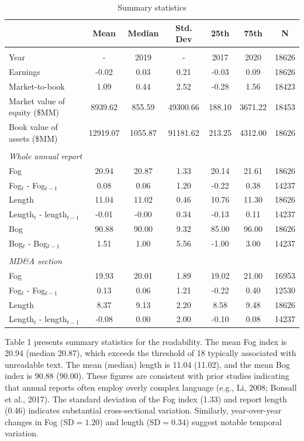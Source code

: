 \documentclass[a4paper]{article}
\begin{document}
\begin{table}[ht]
\centering
\caption{Summary statistics}  
\label{tab:summary_statistics}
\begin{tabular}{lcccccc}
  \hline
 & Mean & Median & Std. Dev & 25th & 75th & N \\ 
  \hline
  \midrule
  \\[0.5ex]
Year & - & 2019 & - & 2017 & 2020 & 18626 \\ 
  Earnings & -0.02 & 0.03 & 0.21 & -0.03 & 0.09 & 18626 \\ 
  Market-to-book & 1.09 & 0.44 & 2.52 & -0.28 & 1.56 & 18423 \\ 
  Market value of equity (\$MM) & 8939.62 & 855.59 & 49300.66 & 188.10 & 3671.22 & 18453 \\ 
  Book value of assets (\$MM) & 12919.07 & 1055.87 & 91181.62 & 213.25 & 4312.00 & 18626 \\ 
  \midrule
\\[0.5ex]
\multicolumn{7}{l}{\textit{Whole annual report}}\\[0.5ex]
  Fog & 20.94 & 20.87 & 1.33 & 20.14 & 21.61 & 18626 \\ 
  Fog$_{t}$ - Fog$_{t-1}$ & 0.08 & 0.06 & 1.20 & -0.22 & 0.38 & 14237 \\ 
  Length & 11.04 & 11.02 & 0.46 & 10.76 & 11.30 & 18626 \\ 
  Length$_{t}$ - length$_{t-1}$ & -0.01 & -0.00 & 0.34 & -0.13 & 0.11 & 14237 \\ 
  Bog & 90.88 & 90.00 & 9.32 & 85.00 & 96.00 & 18626 \\
  Bog$_{t}$ - Bog$_{t-1}$ & 1.51 & 1.00 & 5.56 & -1.00 & 3.00 & 14237 \\ 
    \midrule
\\[0.5ex]  
\multicolumn{7}{l}{\textit{MD\&A section}}\\[0.5ex]
  Fog & 19.93 & 20.01 & 1.89 & 19.02 & 21.00 & 16953 \\ 
  Fog$_{t}$ - Fog$_{t-1}$ & 0.13 & 0.06 & 1.21 & -0.22 & 0.40 & 12530 \\ 
  Length & 8.37 & 9.13 & 2.20 & 8.58 & 9.48 & 18626 \\ 
  Length$_{t}$ - length$_{t-1}$ & -0.08 & 0.00 & 2.00 & -0.10 & 0.08 & 14237 \\ 
   \hline
\end{tabular}
\end{table}

Table 1 presents summary statistics for the readability. The mean Fog index is 20.94 (median 20.87), which exceeds the threshold of 18 typically associated with unreadable text. The mean (median) length is 11.04 (11.02), and the mean Bog index is 90.88 (90.00). These figures are consistent with prior studies indicating that annual reports often employ overly complex language (e.g., Li, 2008; Bonsall et al., 2017). The standard deviation of the Fog index (1.33) and report length (0.46) indicates substantial cross-sectional variation. Similarly, year-over-year changes in Fog ($\mathrm{SD} = 1.20$) and length ($\mathrm{SD} = 0.34$) suggest notable temporal variation.
\end{document}
